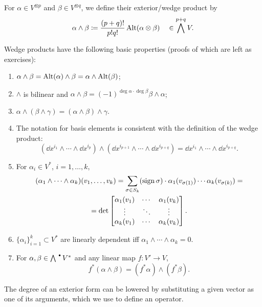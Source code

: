 \begin{defn}
    For $\alpha\in V^{\otimes p}$ and $\beta\in V^{\otimes q}$, we define their exterior/wedge product by
    \[\alpha\wedge\beta\coloneqq\frac{(p+q)!}{p!q!}\operatorname{Alt} (\alpha\otimes \beta)\quad \in \bigwedge^{p+q}V.\]
\end{defn}
Wedge products have the following basic properties (proofs of which are left as exercises):
\begin{enumerate}
    \item $\alpha\wedge\beta=\operatorname{Alt}(\alpha)\wedge\beta=\alpha\wedge\operatorname{Alt}(\beta)$;
    \item $\wedge$ is bilinear and $\alpha\wedge\beta=(-1)^{\deg\alpha\cdot\deg\beta}\beta\wedge\alpha$;
    \item $\alpha\wedge(\beta\wedge\gamma)=(\alpha\wedge\beta)\wedge\gamma$.
    \item The notation for basis elements is consistent with the definition of the wedge product:
    \[(\dd x^{i_1}\wedge\cdots\wedge \dd x^{i_p})\wedge (\dd x^{i_{p+1}}\wedge\cdots\wedge \dd x^{i_{p+q}})=\dd x^{i_1}\wedge\cdots\wedge \dd x^{i_{p+q}}.\]
    \item For $\alpha_i\in V^\ast$, $i=1,\ldots,k$, 
    \begin{multline}
        (\alpha_1\wedge\cdots\wedge\alpha_k)(v_1,\ldots,v_k)=\sum_{\sigma\in S_k}(\operatorname{sign}\sigma)\cdot \alpha_1(v_{\sigma(1)})\cdots\alpha_k(v_{\sigma(k)})=\\=\det \begin{bmatrix}
         \alpha_1(v_1) & \cdots & \alpha_1(v_k)  \\
         \vdots & \ddots & \vdots \\
         \alpha_k(v_1) & \cdots & \alpha_k(v_k) 
    \end{bmatrix}.\label{form determinant f-la}
    \end{multline}
    \item $\{\alpha_i\}_{i=1}^k\subset V^\ast$ are linearly dependent iff $\alpha_1\wedge\cdots\wedge\alpha_k=0$.
    \item For $\alpha,\beta\in\bigwedge^{\smbullet } V^\ast$ and any linear map $f:V'\to V$,
    \[f^\ast(\alpha\wedge\beta)=(f^\ast\alpha)\wedge(f^\ast\beta).\label{pullbacks of wedges}\]
\end{enumerate}

The degree of an exterior form can be lowered by substituting a given vector as one of its arguments, which we use to define an operator.


